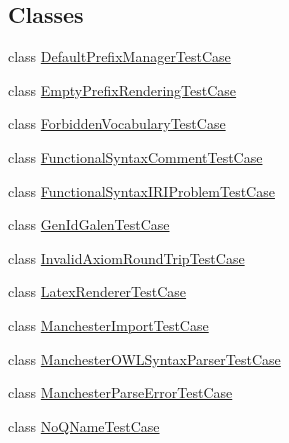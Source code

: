 \subsection*{Classes}
\begin{DoxyCompactItemize}
\item 
class \hyperlink{classorg_1_1semanticweb_1_1owlapi_1_1api_1_1test_1_1syntax_1_1_default_prefix_manager_test_case}{Default\-Prefix\-Manager\-Test\-Case}
\item 
class \hyperlink{classorg_1_1semanticweb_1_1owlapi_1_1api_1_1test_1_1syntax_1_1_empty_prefix_rendering_test_case}{Empty\-Prefix\-Rendering\-Test\-Case}
\item 
class \hyperlink{classorg_1_1semanticweb_1_1owlapi_1_1api_1_1test_1_1syntax_1_1_forbidden_vocabulary_test_case}{Forbidden\-Vocabulary\-Test\-Case}
\item 
class \hyperlink{classorg_1_1semanticweb_1_1owlapi_1_1api_1_1test_1_1syntax_1_1_functional_syntax_comment_test_case}{Functional\-Syntax\-Comment\-Test\-Case}
\item 
class \hyperlink{classorg_1_1semanticweb_1_1owlapi_1_1api_1_1test_1_1syntax_1_1_functional_syntax_i_r_i_problem_test_case}{Functional\-Syntax\-I\-R\-I\-Problem\-Test\-Case}
\item 
class \hyperlink{classorg_1_1semanticweb_1_1owlapi_1_1api_1_1test_1_1syntax_1_1_gen_id_galen_test_case}{Gen\-Id\-Galen\-Test\-Case}
\item 
class \hyperlink{classorg_1_1semanticweb_1_1owlapi_1_1api_1_1test_1_1syntax_1_1_invalid_axiom_round_trip_test_case}{Invalid\-Axiom\-Round\-Trip\-Test\-Case}
\item 
class \hyperlink{classorg_1_1semanticweb_1_1owlapi_1_1api_1_1test_1_1syntax_1_1_latex_renderer_test_case}{Latex\-Renderer\-Test\-Case}
\item 
class \hyperlink{classorg_1_1semanticweb_1_1owlapi_1_1api_1_1test_1_1syntax_1_1_manchester_import_test_case}{Manchester\-Import\-Test\-Case}
\item 
class \hyperlink{classorg_1_1semanticweb_1_1owlapi_1_1api_1_1test_1_1syntax_1_1_manchester_o_w_l_syntax_parser_test_case}{Manchester\-O\-W\-L\-Syntax\-Parser\-Test\-Case}
\item 
class \hyperlink{classorg_1_1semanticweb_1_1owlapi_1_1api_1_1test_1_1syntax_1_1_manchester_parse_error_test_case}{Manchester\-Parse\-Error\-Test\-Case}
\item 
class \hyperlink{classorg_1_1semanticweb_1_1owlapi_1_1api_1_1test_1_1syntax_1_1_no_q_name_test_case}{No\-Q\-Name\-Test\-Case}

\end{DoxyCompactItemize}
